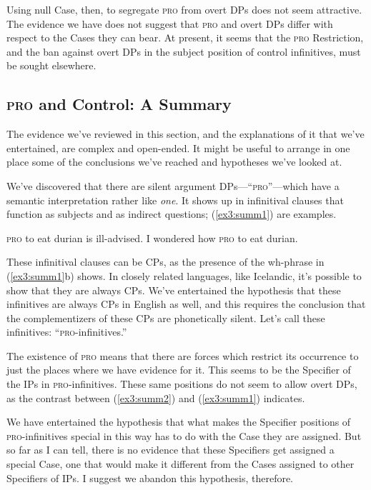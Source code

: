 Using null Case, then, to segregate \textsc{pro} from overt DPs does not seem attractive. The evidence we have does not suggest that \textsc{pro} and overt DPs differ with respect to the Cases they can bear. At present, it seems that the \textsc{pro} Restriction, and the ban against overt DPs in the subject position of control infinitives, must be sought elsewhere.

\subsection{\textsc{pro} and Control: A Summary}

The evidence we've reviewed in this section, and the explanations of it that we've entertained, are complex and open-ended. It might be useful to arrange in one place some of the conclusions we've reached and hypotheses we've looked at. 

We've discovered that there are silent argument DPs---``\textsc{pro}''---which have a semantic interpretation rather like \emph{one}. It shows up in infinitival clauses that function as subjects and as indirect questions; (\ref{ex3:summ1}) are examples.
\begin{exe}
\ex \label{ex3:summ1} 
\begin{xlist}
	\ex \textsc{pro} to eat durian is ill-advised.
	\ex I wondered how \textsc{pro} to eat durian.
\end{xlist}
\end{exe}
These infinitival clauses can be CPs, as the presence of the wh-phrase in (\ref{ex3:summ1}b) shows. In closely related languages, like Icelandic, it's possible to show that they are always CPs. We've entertained the hypothesis that these infinitives are always CPs in English as well, and this requires the conclusion that the complementizers of these CPs are phonetically silent. Let's call these infinitives: ``\textsc{pro}-infinitives.''

The existence of \textsc{pro} means that there are forces which restrict its occurrence to just the places where we have evidence for it. This seems to be the Specifier of the IPs in \textsc{pro}-infinitives. These same positions do not seem to allow overt DPs, as the contrast between (\ref{ex3:summ2}) and (\ref{ex3:summ1}) indicates.
\begin{exe}
\ex \label{ex3:summ2} 
\begin{xlist}
\end{xlist}
\end{exe}
We have entertained the hypothesis that what makes the Specifier positions of \textsc{pro}-infinitives special in this way has to do with the Case they are assigned. But so far as I can tell, there is no evidence that these Specifiers get assigned a special Case, one that would make it different from the Cases assigned to other Specifiers of IPs. I suggest we abandon this hypothesis, therefore.

